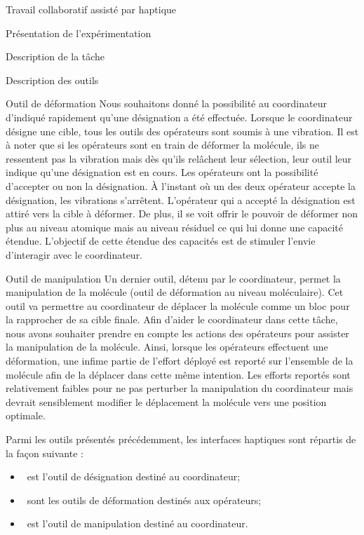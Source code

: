\documentclass[myfrancais]{mythesis}
\begin{document}
\begin{mychapter}{Travail collaboratif assisté par haptique}
\begin{mysection}{Présentation de l'expérimentation}
\begin{mysubsection}{Description de la tâche}
\begin{mysubsubsection}{Description des outils}
\begin{myparagraph}{Outil de déformation}
						Nous souhaitons donné la possibilité au coordinateur d'indiqué rapidement qu'une désignation a été effectuée.
						Lorsque le coordinateur désigne une cible, tous les outils des opérateurs sont soumis à une vibration.
						Il est à noter que si les opérateurs sont en train de déformer la molécule, ils ne ressentent pas la vibration mais dès qu'ils relâchent leur sélection, leur outil leur indique qu'une désignation est en cours.
						Les opérateurs ont la possibilité d'accepter ou non la désignation.
						À l'instant où un des deux opérateur accepte la désignation, les vibrations s'arrêtent.
						L'opérateur qui a accepté la désignation est attiré vers la cible à déformer.
						De plus, il se voit offrir le pouvoir de déformer non plus au niveau atomique mais au niveau résiduel ce qui lui donne une capacité étendue.
						L'objectif de cette étendue des capacités est de stimuler l'envie d'interagir avec le coordinateur.
					\end{myparagraph}
					\begin{myparagraph}{Outil de manipulation}
						Un dernier outil, détenu par le coordinateur, permet la manipulation de la molécule (outil de déformation au niveau moléculaire).
						Cet outil va permettre au coordinateur de déplacer la molécule comme un bloc pour la rapprocher de sa cible finale.
						Afin d'aider le coordinateur dans cette tâche, nous avons souhaiter prendre en compte les actions des opérateurs pour assister la manipulation de la molécule.
						Ainsi, lorsque les opérateurs effectuent une déformation, une infime partie de l'effort déployé est reporté sur l'ensemble de la molécule afin de la déplacer dans cette même intention.
						Les efforts reportés sont relativement faibles pour ne pas perturber la manipulation du coordinateur mais devrait sensiblement modifier le déplacement la molécule vers une position optimale.
					\end{myparagraph}

					Parmi les outils présentés précédemment, les interfaces haptiques sont répartis de la façon suivante :
					\begin{itemize}
						\item {}~\myOmni est l'outil de désignation destiné au coordinateur;
						\item {}~\myOmni sont les outils de déformation destinés aux opérateurs;
						\item {}~\myDesktop est l'outil de manipulation destiné au coordinateur.
					\end{itemize}


\end{mysubsubsection}
\end{mysubsection}
\end{mysection}
\end{mychapter}
\end{document}
